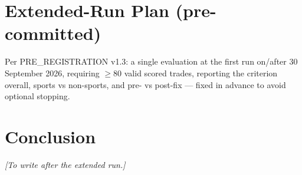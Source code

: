 \documentclass[11pt]{article}
\begin{document}
\section{Extended-Run Plan (pre-committed)}
Per PRE\_REGISTRATION v1.3: a single evaluation at the first run on/after
30 September 2026, requiring $\geq 80$ valid scored trades, reporting the
criterion overall, sports vs non-sports, and pre- vs post-fix --- fixed in
advance to avoid optional stopping.

\section{Conclusion}
\emph{[To write after the extended run.]}
\end{document}
